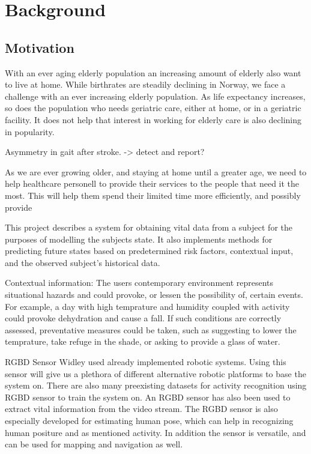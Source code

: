 \chapter{Background}

\section{Motivation}
With an ever aging elderly population an increasing amount of elderly also want to live at home.
While birthrates are steadily declining in Norway, we face a challenge with an ever increasing elderly population. As life expectancy increases, so does the population who needs geriatric care, either at home, or in a geriatric facility. It does not help that interest in working for elderly care is also declining in popularity.

Asymmetry in gait after stroke. -> detect and report?







As we are ever growing older, and staying at home until a greater age, we need to help healthcare personell to provide their services to the people that need it the most. This will help them spend their limited time more efficiently, and possibly provide 

This project describes a system for obtaining vital data from a subject for the purposes of modelling the subjects state. It also implements methods for predicting future states based on predetermined risk factors, contextual input, and the observed subject's historical data.


Contextual information: The users contemporary environment represents situational hazards and could provoke, or lessen the possibility of, certain events. For example, a day with high temprature and humidity coupled with activity could provoke dehydration and cause a fall. If such conditions are correctly assessed, preventative measures could be taken, such as suggesting to lower the temprature, take refuge in the shade, or asking to provide a glass of water.


RGBD Sensor
Widley used already implemented robotic systems. Using this sensor will give us a plethora of different alternative robotic platforms to base the system on. There are also many preexisting datasets for activity recognition using RGBD sensor to train the system on. An RGBD sensor has also been used to extract vital information from the video stream.
The RGBD sensor is also especially developed for estimating human pose, which can help in recognizing human positure and as mentioned activity.
In addition the sensor is versatile, and can be used for mapping and navigation as well.

